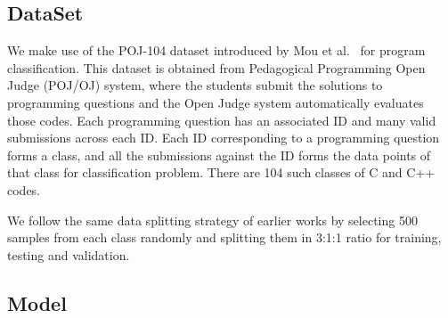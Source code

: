 
\subsection{DataSet}

We make use of the POJ-104 dataset introduced by Mou et al.~\cite{tbcnn-aaai16} for program classification. This dataset is obtained from Pedagogical Programming Open Judge (POJ/OJ) system, where the students submit the solutions to programming questions and the Open Judge system automatically evaluates those codes. 
Each programming question has an associated ID and many valid submissions across each ID. 
Each ID corresponding to a programming question forms a class, and all the submissions against the ID forms the data points of that class for classification problem. There are 104 such classes of C and C++ codes.

We follow the same data splitting strategy of earlier works by selecting 500 samples from each class randomly and splitting them in 3:1:1 ratio for training, testing and validation.


\subsection{Model}


